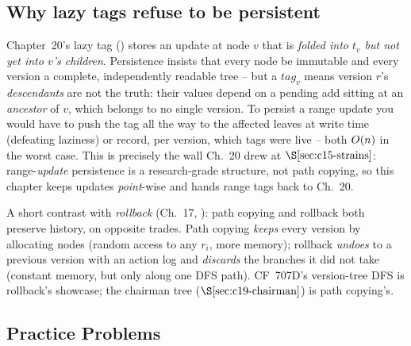 \subsection{Why lazy tags refuse to be persistent}

\begin{warningbox}
Chapter~20's lazy tag () stores an update at node \(v\) that is \emph{folded into \(t_v\) but not yet into \(v\)'s children}.  Persistence insists that every node be immutable and every version a complete, independently readable tree -- but a \(\mathit{tag}_v\) means version \(r\)'s \emph{descendants} are not the truth: their values depend on a pending add sitting at an \emph{ancestor} of \(v\), which belongs to no single version.  To persist a range update you would have to push the tag all the way to the affected leaves at write time (defeating laziness) or record, per version, which tags were live -- both \(O(n)\) in the worst case.  This is precisely the wall Ch.~20 drew at \(\secref{c15-strains}\): range-\emph{update} persistence is a research-grade structure, not path copying, so this chapter keeps updates \emph{point}-wise and hands range tags back to Ch.~20.
\end{warningbox}

\noindent A short contrast with \emph{rollback} (Ch.~17, ): path copying and rollback both preserve history, on opposite trades.  Path copying \emph{keeps} every version by allocating nodes (random access to any \(r_i\), more memory); rollback \emph{undoes} to a previous version with an action log and \emph{discards} the branches it did not take (constant memory, but only along one DFS path).  CF~707D's version-tree DFS is rollback's showcase; the chairman tree (\(\secref{c19-chairman}\)) is path copying's.

\subsection{Practice Problems}

